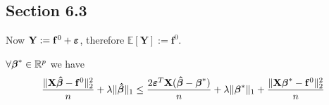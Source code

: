 \subsection{Section 6.3}

Now $\mathbf{Y} :=\mathbf{f}^{0} + \boldsymbol{\varepsilon}$, therefore $\mathbb{E} [\mathbf{Y}] :=\mathbf{f}^{0}$.


\begin{lemma}
    $\forall \boldsymbol{\beta}^* \in \mathbb{R}^p$ we have
    \begin{equation}
        \frac{\|\mathbf{X} \boldsymbol{\hat{\beta}} - \mathbf{f}^0 \|_{2}^{2}}{n} + \lambda\| \boldsymbol{\hat{\beta}} \|_{1} \leq \frac{2 \boldsymbol{\varepsilon}^T \mathbf{X} (\boldsymbol{\hat{\beta}} - \boldsymbol{\beta}^*)}{n} + \lambda \| \boldsymbol{\beta}^*\|_{1} + \frac{\|\mathbf{X} \boldsymbol{\beta}^* - \mathbf{f}^0\|_{2}^{2}}{n}
    \end{equation}
\end{lemma}
